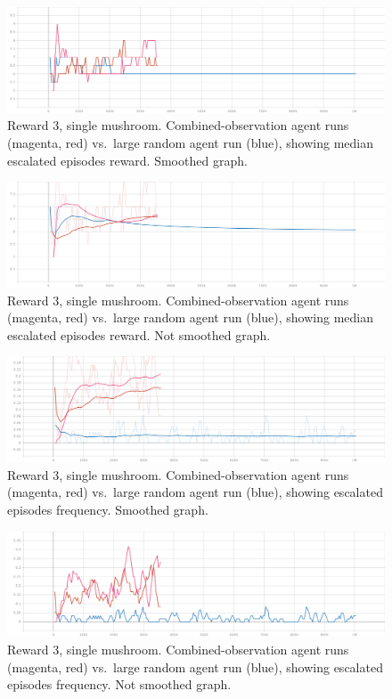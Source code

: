 \documentclass[]{article}
\begin{document}
\begin{figure}
\centering
\includegraphics{./img/last-exper-median-crash-reward-rough.png}
\caption{Reward 3, single mushroom. Combined-observation agent runs
(magenta, red) vs.~large random agent run (blue), showing median
escalated episodes reward. Smoothed graph.}
\end{figure}

\begin{figure}
\centering
\includegraphics{./img/last-exper-median-crash-reward-smooth.png}
\caption{Reward 3, single mushroom. Combined-observation agent runs
(magenta, red) vs.~large random agent run (blue), showing median
escalated episodes reward. Not smoothed graph.}
\end{figure}

\begin{figure}
\centering
\includegraphics{./img/114090722-147be380-98b8-11eb-9a06-2831ef960127.png}
\caption{Reward 3, single mushroom. Combined-observation agent runs
(magenta, red) vs.~large random agent run (blue), showing escalated
episodes frequency. Smoothed graph.}
\end{figure}

\begin{figure}
\centering
\includegraphics{./img/114090782-28bfe080-98b8-11eb-9912-6b584a28ca75.png}
\caption{Reward 3, single mushroom. Combined-observation agent runs
(magenta, red) vs.~large random agent run (blue), showing escalated
episodes frequency. Not smoothed graph.}
\end{figure}
\end{document}
